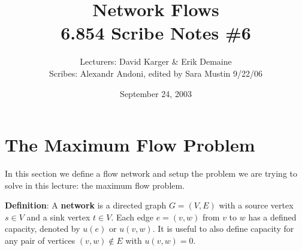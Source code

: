 \documentclass{article}
\title{Network Flows\\ 6.854 Scribe Notes \#6}
\date{September 24, 2003}
\author{Lecturers: David Karger & Erik Demaine\\ Scribes: Alexandr Andoni, edited by Sara Mustin 9/22/06}
\begin{document}

%
%
%
%

%



\section{The Maximum Flow Problem}

In this section we define a flow network and setup the problem we are
trying to solve in this lecture: the maximum flow problem.


\textbf{Definition}:
A \textbf{network} is a directed graph $G=(V,E)$ with a source
vertex $s \in V$ and a sink vertex $t \in V$.  Each edge $e =
(v, w)$ from $v$ to $w$ has a defined capacity, denoted by
$u(e)$ or $u(v, w)$.  It is useful to also define capacity for
any pair of vertices $(v, w) \not \in E$ with $u(v, w) = 0$.
\end{document}

